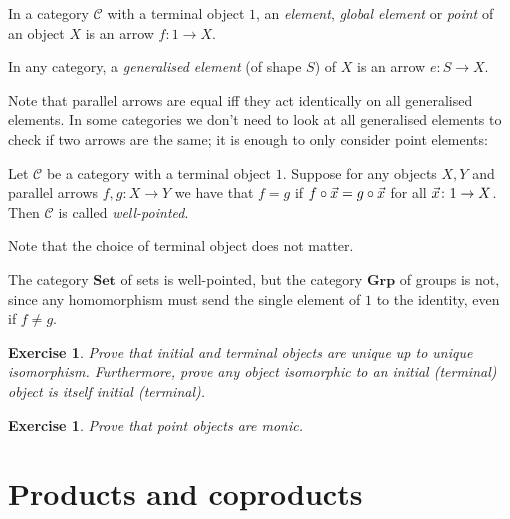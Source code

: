 \documentclass[article, a4paper, 11pt, oneside]{memoir}
\numberwithin{equation}{chapter}
\newcommand{\cat}[1]{\mathcal{#1}}
\newcommand{\ncat}[1]{\mathbf{#1}} %
\newcommand{\catSet}{\ncat{Set}}
\newcommand{\catGrp}{\ncat{Grp}}
\newcommand{\catC}{\cat{C}}
\theoremstyle{myexample}
\newtheorem{exercise}[theorem]{Exercise}
\theoremstyle{myexamplebreak}
\begin{document}
\begin{definition}
    In a category $\catC$ with a terminal object $1$, an \emph{element}, \emph{global element} or \emph{point} of an object $X$ is an arrow $f \colon 1 \to X$.

    In any category, a \emph{generalised element} (of shape $S$) of $X$ is an arrow $e \colon S \to X$.
\end{definition}
%
Note that parallel arrows are equal iff they act identically on all generalised elements. In some categories we don't need to look at all generalised elements to check if two arrows are the same; it is enough to only consider point elements:

\begin{definition}
    Let $\catC$ be a category with a terminal object $1$. Suppose for any objects $X,Y$ and parallel arrows $f,g \colon X \to Y$ we have that $f = g$ if $f \circ \vec{x} = g \circ \vec{x}$ for all $\vec{x} \colon 1 \to X$. Then $\catC$ is called \emph{well-pointed}.
\end{definition}
%
Note that the choice of terminal object does not matter.


\begin{example}
    The category $\catSet$ of sets is well-pointed, but the category $\catGrp$ of groups is not, since any homomorphism must send the single element of $1$ to the identity, even if $f \neq g$.
\end{example}


\begin{exercise}
    Prove that initial and terminal objects are unique up to unique isomorphism. Furthermore, prove any object isomorphic to an initial (terminal) object is itself initial (terminal).
\end{exercise}


\begin{exercise}
    Prove that point objects are monic.
\end{exercise}



\chapter{Products and coproducts}
\end{document}
